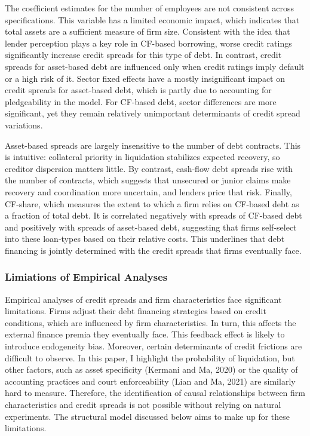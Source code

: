 \documentclass[12pt]{article}
\begin{document}
The coefficient estimates for the number of employees are not consistent across specifications. This variable has a limited economic impact, which indicates that total assets are a sufficient measure of firm size. Consistent with the idea that lender perception plays a key role in CF-based borrowing, worse credit ratings significantly increase credit spreads for this type of debt. In contrast, credit spreads for asset-based debt are influenced only when credit ratings imply default or a high risk of it. Sector fixed effects have a mostly insignificant impact on credit spreads for asset-based debt, which is partly due to accounting for pledgeability in the model. For CF-based debt, sector differences are more significant, yet they remain relatively unimportant determinants of credit spread variations.

Asset-based spreads are largely insensitive to the number of debt contracts. This is intuitive: collateral priority in liquidation stabilizes expected recovery, so creditor dispersion matters little. By contrast, cash-flow debt spreads rise with the number of contracts, which suggests that unsecured or junior claims make recovery and coordination more uncertain, and lenders price that risk. Finally, CF-share, which measures the extent to which a firm relies on CF-based debt as a fraction of total debt. It is correlated negatively with spreads of CF-based debt and positively with spreads of asset-based debt, suggesting that firms self-select into these loan-types based on their relative costs. This underlines that debt financing is jointly determined with the credit spreads that firms eventually face. 


\subsubsection{Limiations of Empirical Analyses \label{sec:limitations credit spreads}} 
Empirical analyses of credit spreads and firm characteristics face significant limitations. Firms adjust their debt financing strategies based on credit conditions, which are influenced by firm characteristics. In turn, this affects the external finance premia they eventually face. This feedback effect is likely to introduce endogeneity bias. Moreover, certain determinants of credit frictions are difficult to observe. In this paper, I highlight the probability of liquidation, but other factors, such as asset specificity (Kermani and Ma, 2020) or the quality of accounting practices and court enforceability (Lian and Ma, 2021) are similarly hard to measure. Therefore, the identification of causal relationships between firm characteristics and credit spreads is not possible without relying on natural experiments. The structural model discussed below aims to make up for these limitations. 
\end{document}
